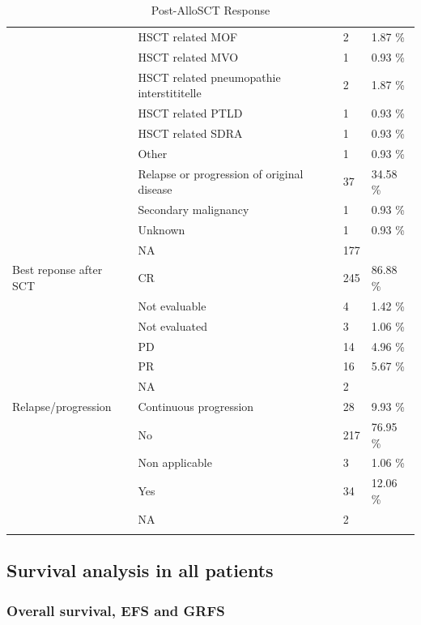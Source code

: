 \documentclass[a4paper,11pt] {article}
\begin{document}
\begin{longtable}{llll}
   & HSCT related MOF & 2 & 1.87 \% \\ 
   & HSCT related MVO & 1 & 0.93 \% \\ 
   & HSCT related pneumopathie interstititelle & 2 & 1.87 \% \\ 
   & HSCT related PTLD & 1 & 0.93 \% \\ 
   & HSCT related SDRA & 1 & 0.93 \% \\ 
   & Other & 1 & 0.93 \% \\ 
   & Relapse or progression of original disease & 37 & 34.58 \% \\ 
   & Secondary malignancy & 1 & 0.93 \% \\ 
   & Unknown & 1 & 0.93 \% \\ 
   & NA & 177 &  \\ 
  Best reponse after SCT & CR & 245 & 86.88 \% \\ 
   & Not evaluable & 4 & 1.42 \% \\ 
   & Not evaluated & 3 & 1.06 \% \\ 
   & PD & 14 & 4.96 \% \\ 
   & PR & 16 & 5.67 \% \\ 
   & NA & 2 &  \\ 
  Relapse/progression & Continuous progression & 28 & 9.93 \% \\ 
   & No & 217 & 76.95 \% \\ 
   & Non applicable  & 3 & 1.06 \% \\ 
   & Yes & 34 & 12.06 \% \\ 
   & NA & 2 &  \\ 
   \hline
\hline
\caption{Post-AlloSCT Response} 
\label{tab:pg}
\end{longtable}


\pagebreak[4]
\begin{landscape}





\end{landscape}

\restoregeometry

\subsection{Survival analysis in all patients}

\subsubsection{Overall survival, EFS and  GRFS}
\end{document}
